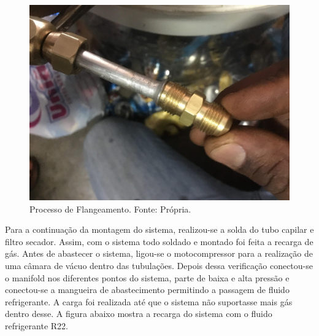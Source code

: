                         \begin{figure}[!htb]
                            \centering
                            \includegraphics[scale= 0.2]{figuras/processo-flagelamento.png}
                            \caption{Processo de Flangeamento. Fonte: Própria.}
                            \label{processo-flageamento}
                        \end{figure}

                        Para a continuação da montagem do sistema, realizou-se a solda do tubo capilar
                        e filtro secador. Assim, com o sistema todo soldado e montado foi feita a
                        recarga de gás. Antes de abastecer o sistema, ligou-se o motocompressor para a
                        realização de uma câmara de vácuo dentro das tubulações. Depois dessa verificação
                        conectou-se o manifold nos diferentes pontos do sistema, parte de baixa e alta
                        pressão e conectou-se a mangueira de abastecimento permitindo a passagem de
                        fluido refrigerante. A carga foi realizada até que o sistema não suportasse
                        mais gás dentro desse. A figura abaixo mostra a recarga do sistema com o
                        fluido refrigerante R22. 

